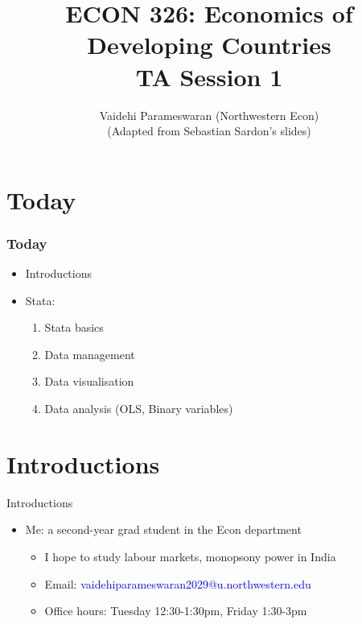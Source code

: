 \documentclass[11pt,notes=hide,aspectratio=169,mathserif]{beamer}
\title[class]{ECON 326: Economics of Developing Countries \\ TA Session 1}
\author[vaidehi's class ]{Vaidehi Parameswaran (Northwestern Econ) \\ (Adapted from Sebastian Sardon's slides) }
\date{\monthname[\the\month] \the\year}
\begin{document}
\begin{frame}[plain]
\titlepage
\end{frame}

\section{Today}
\begin{frame}
    
\frametitle{Today}
\begin{itemize}
\vspace{-.3cm}
\item Introductions 
\medskip
\item Stata: \smallskip
\begin{enumerate}
    \item Stata basics
    \smallskip
    \item Data management
    \item Data visualisation
    \item Data analysis (OLS, Binary variables)
\end{enumerate}
\end{itemize}
\end{frame}

\section{Introductions}
\begin{frame}{Introductions}
\begin{itemize}
\item Me: a second-year grad student in the Econ department 
\begin{itemize}
        \item I hope to study labour markets, monopsony power in India 
        \item Email: \textcolor{blue}{vaidehiparameswaran2029@u.northwestern.edu} 
        \item Office hours: Tuesday 12:30-1:30pm, Friday 1:30-3pm
\end{itemize}
\end{itemize}
\end{frame}
\end{document}
